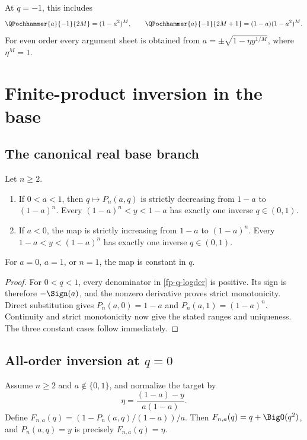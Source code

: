 At \(q=-1\), this includes
\[
 \QPochhammer{a}{-1}{2M}=(1-a^2)^M,\qquad
 \QPochhammer{a}{-1}{2M+1}=(1-a)(1-a^2)^M.
\]
For even order every argument sheet is obtained from
\(a=\pm\sqrt{1-\eta y^{1/M}}\), where \(\eta^M=1\).

\section{Finite-product inversion in the base}
\label{fp-base-inversion}

\subsection{The canonical real base branch}

\begin{theorem}
\label{fp-global-base}
Let \(n\geq2\).
\begin{enumerate}
\item If \(0<a<1\), then \(q\mapsto P_n(a,q)\) is strictly decreasing from
  \(1-a\) to \((1-a)^n\).  Every
  \((1-a)^n<y<1-a\) has exactly one inverse \(q\in(0,1)\).
\item If \(a<0\), the map is strictly increasing from \(1-a\) to
  \((1-a)^n\).  Every \(1-a<y<(1-a)^n\) has exactly one inverse
  \(q\in(0,1)\).
\end{enumerate}
For \(a=0\), \(a=1\), or \(n=1\), the map is constant in \(q\).
\end{theorem}

\begin{proof}
For \(0<q<1\), every denominator in \cref{fp-q-logder} is positive.  Its sign
is therefore \(-\Sign(a)\), and the nonzero derivative proves strict
monotonicity.  Direct substitution gives \(P_n(a,0)=1-a\) and
\(P_n(a,1)=(1-a)^n\).  Continuity and strict monotonicity now give the stated
ranges and uniqueness.  The three constant cases follow immediately.
\end{proof}

\subsection{All-order inversion at \(q=0\)}

Assume \(n\geq2\) and \(a\notin\{0,1\}\), and normalize the target by
\begin{equation}
 \eta=\frac{(1-a)-y}{a(1-a)}.
 \label{fp-small-base-coordinate}
\end{equation}
Define \(F_{n,a}(q)=(1-P_n(a,q)/(1-a))/a\).  Then
\(F_{n,a}(q)=q+\BigO(q^2)\), and \(P_n(a,q)=y\) is precisely
\(F_{n,a}(q)=\eta\).

